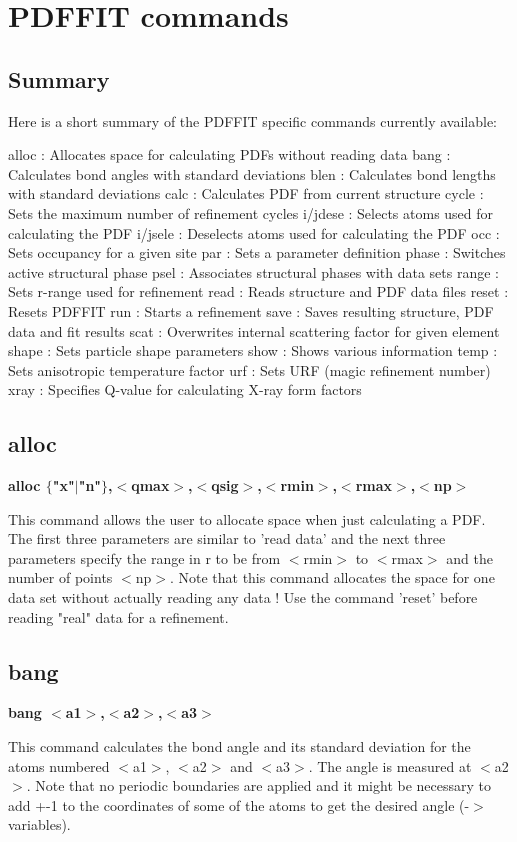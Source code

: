 \chapter{PDFFIT commands}
\section{Summary}
Here is a short summary of the PDFFIT specific commands currently 
available: 
\par
\begin{MacVerbatim}
alloc   : Allocates space for calculating PDFs without reading data
bang    : Calculates bond angles with standard deviations
blen    : Calculates bond lengths with standard deviations
calc    : Calculates PDF from current structure
cycle   : Sets the maximum number of refinement cycles
i/jdese : Selects atoms used for calculating the PDF
i/jsele : Deselects atoms used for calculating the PDF
occ     : Sets occupancy for a given site
par     : Sets a parameter definition
phase   : Switches active structural phase
psel    : Associates structural phases with data sets
range   : Sets r-range used for refinement
read    : Reads structure and PDF data files
reset   : Resets PDFFIT
run     : Starts a refinement
save    : Saves resulting structure, PDF data and fit results
scat    : Overwrites internal scattering factor for given element
shape   : Sets particle shape parameters
show    : Shows various information
temp    : Sets anisotropic temperature factor
urf     : Sets URF (magic refinement number)
xray    : Specifies Q-value for calculating X-ray form factors
\end{MacVerbatim}
\section{alloc}
{\bf alloc $ \{$"x"$| $"n"$\} $,$ <$qmax$> $,$ <$qsig$> $,$ <$rmin$> $,$ <$rmax$> $,$ <$np$> $ \par }
\par
\vspace{3pt}
This command allows the user to allocate space when just calculating 
a PDF. The first three parameters are similar to 'read data' and 
the next three parameters specify the range in r to be from $ <$rmin$> $ 
to $ <$rmax$> $ and the number of points $ <$np$> $. Note that this command 
allocates the space for one data set without actually reading any 
data ! Use the command 'reset' before reading "real" data for a 
refinement. 
\section{bang}
{\bf bang $ <$a1$> $,$ <$a2$> $,$ <$a3$> $ \par }
\par
\vspace{3pt}
This command calculates the bond angle and its standard deviation 
for the atoms numbered $ <$a1$> $, $ <$a2$> $ and $ <$a3$> $. The angle is measured 
at $ <$a2$> $. Note that no periodic boundaries are applied and it might 
be necessary to add +-1 to the coordinates of some of the atoms to 
get the desired angle (-$> $ variables). 
